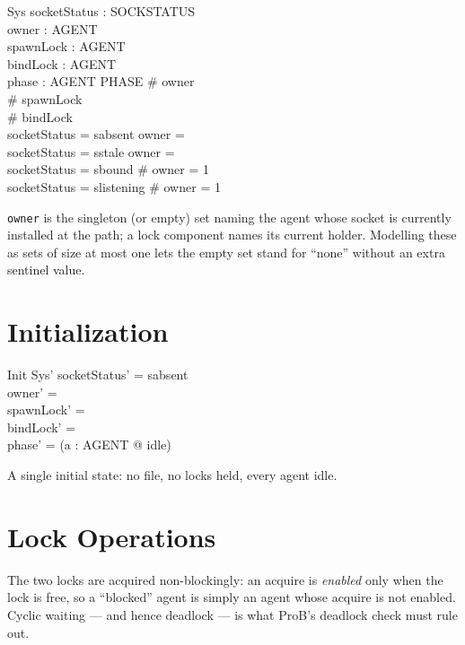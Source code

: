 \documentclass[a4paper,10pt,fleqn]{article}
\begin{document}
\begin{schema}{Sys}
  socketStatus : SOCKSTATUS \\
  owner : \power AGENT \\
  spawnLock : \power AGENT \\
  bindLock : \power AGENT \\
  phase : AGENT \fun PHASE
\where
  \# owner  \\
  \# spawnLock  \\
  \# bindLock  \\
  socketStatus = sabsent \implies owner = \emptyset \\
  socketStatus = sstale \implies owner = \emptyset \\
  socketStatus = sbound \implies \# owner = 1 \\
  socketStatus = slistening \implies \# owner = 1
\end{schema}

\texttt{owner} is the singleton (or empty) set naming the agent whose
socket is currently installed at the path; a lock component names its
current holder.  Modelling these as sets of size at most one lets the
empty set stand for ``none'' without an extra sentinel value.

\section{Initialization}

\begin{schema}{Init}
  Sys'
\where
  socketStatus' = sabsent \\
  owner' = \emptyset \\
  spawnLock' = \emptyset \\
  bindLock' = \emptyset \\
  phase' = (\lambda a : AGENT @ idle)
\end{schema}

A single initial state: no file, no locks held, every agent idle.

\section{Lock Operations}

The two locks are acquired non-blockingly: an acquire is \emph{enabled}
only when the lock is free, so a ``blocked'' agent is simply an agent
whose acquire is not enabled.  Cyclic waiting --- and hence deadlock ---
is what ProB's deadlock check must rule out.
\end{document}

